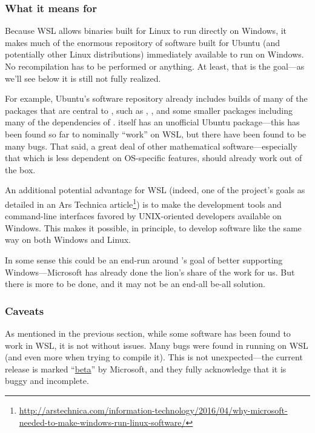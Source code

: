 \documentclass{deliverablereport}
\begin{document}
\subsubsection{What it means for \ODK}

Because WSL allows binaries built for Linux to run directly on
Windows, it makes much of the enormous repository of software built
for Ubuntu (and potentially other Linux distributions) immediately
available to run on Windows.  No recompilation has to be performed or
anything. At least, that is the goal---as we'll see below it is still
not fully realized.

For example, Ubuntu's software repository already includes builds of
many of the packages that are central to \ODK, such as
\href{http://packages.ubuntu.com/trusty/gap}{\GAP},
\href{http://packages.ubuntu.com/trusty/pari-gp}{\Pari}, and some
smaller packages including many of the dependencies of \Sage.  \Sage
itself has an unofficial Ubuntu package---this has been found so far
to nominally ``work'' on WSL, but there have been found to be many
bugs.  That said, a great deal of other mathematical
software---especially that which is less dependent on OS-specific
features, should already work out of the box.

An additional potential advantage for WSL (indeed, one of the
project's goals as detailed in an Ars Technica
article\footnote{\url{http://arstechnica.com/information-technology/2016/04/why-microsoft-needed-to-make-windows-run-linux-software/}})
is to make the development tools and command-line interfaces favored
by UNIX-oriented developers available on Windows.  This makes it
possible, in principle, to develop software like \Sage the same way on
both Windows and Linux.

In some sense this could be an end-run around \ODK's goal of better
supporting Windows---Microsoft has already done the lion's share of
the work for us.  But there is more to be done, and it may not be an
end-all be-all solution.


\subsubsection{Caveats}

As mentioned in the previous section, while some \ODK software has
been found to work in WSL, it is not without issues.  Many bugs were
found in running \Sage on WSL (and even more when trying to compile
it).  This is not unexpected---the current release is marked
``\href{https://msdn.microsoft.com/en-us/commandline/wsl/install_guide}{beta}''
by Microsoft, and they fully acknowledge that it is buggy and
incomplete.
\end{document}

